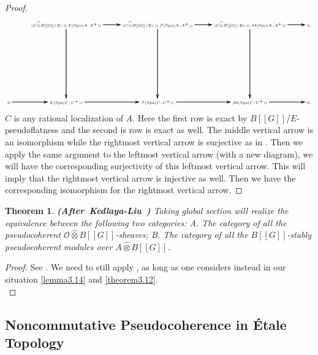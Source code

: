 \documentclass[12pt]{amsart}
\newtheorem{theorem}{Theorem}[section]
\theoremstyle{definition}
\numberwithin{equation}{section}
\begin{document}
\begin{proof}
\[ \tiny
\xymatrix@C+0pc@R+6pc{
 &(C\widehat{\otimes}B[[G]]/E)\otimes\mathcal{K}(\mathrm{Spa}(A,A^+))   \ar[r]\ar[r]\ar[r] \ar[d]\ar[d]\ar[d] &(C\widehat{\otimes}B[[G]]/E)\otimes\mathcal{F}(\mathrm{Spa}(A,A^+)) \ar[r]\ar[r]\ar[r] \ar[d]\ar[d]\ar[d] & (C\widehat{\otimes}B[[G]]/E)\otimes\mathcal{M}(\mathrm{Spa}(A,A^+))\ar[r]\ar[r]\ar[r]  \ar[d]\ar[d]\ar[d]&0,\\
0 \ar[r]\ar[r]\ar[r] &\mathcal{K}(\mathrm{Spa}(C,C^+))   \ar[r]\ar[r]\ar[r] &\mathcal{F}(\mathrm{Spa}(C,C^+)) \ar[r]\ar[r]\ar[r] & \mathcal{M}(\mathrm{Spa}(C,C^+)) \ar[r]\ar[r]\ar[r] &0,\\
}
\]
$C$ is any rational localization of $A$. Here the first row is exact by $B[[G]]/E$-pseudoflatness and the second is row is exact as well. The middle vertical arrow is an isomorphism while the rightmost vertical arrow is surjective as in \cite[Lemma 2.5.4]{KL2}. Then we apply the same argument to the leftmost vertical arrow (with a new diagram), we will have the corresponding surjectivity of this leftmost vertical arrow. This will imply that the rightmost vertical arrow is injective as well. Then we have the corresponding isomorphism for the rightmost vertical arrow.
\end{proof}




\begin{theorem}\mbox{\bf{(After Kedlaya-Liu \cite[Theorem 2.5.5]{KL2})}} \label{theorem3.15}
Taking global section will realize the equivalence between the following two categories: A. The category of all the pseudocoherent $\mathcal{O}\widehat{\otimes}B[[G]]$-sheaves; B. The category of all the $B[[G]]$-stably pseudocoherent modules over $A\widehat{\otimes}B[[G]]$. 	
\end{theorem}


\begin{proof}
See \cite[Theorem 2.5.5]{KL2}. We need to still apply \cite[Proposition 2.4.20]{KL1}, as long as one considers instead in our situation \cref{lemma3.14} and \cref{theorem3.12}.\\	
\end{proof}







\subsection{Noncommutative Pseudocoherence in \'Etale Topology}
\end{document}
